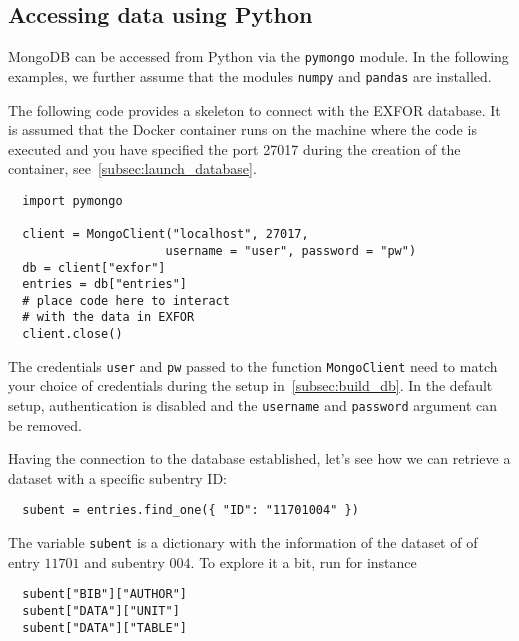 \documentclass[12pt,a4paper]{scrartcl}
\begin{document}
 \subsection{Accessing data using Python}
 MongoDB can be accessed from Python via the \verb|pymongo| module.
 In the following examples, we further assume that the modules \verb|numpy| and \verb|pandas| are installed.

 The following code provides a skeleton to connect with the EXFOR database.
 It is assumed that the Docker container runs on the machine where the code is executed and you have specified the port 27017 during the creation of the container, see~\cref{subsec:launch_database}.

\begin{verbatim}
  import pymongo
 
  client = MongoClient("localhost", 27017,
                      username = "user", password = "pw")                      
  db = client["exfor"]
  entries = db["entries"] 
  # place code here to interact
  # with the data in EXFOR 
  client.close()
\end{verbatim}
The credentials \verb|user| and \verb|pw| passed to the function \verb|MongoClient| need to match your choice of credentials during the setup in~\cref{subsec:build_db}.
In the default setup, authentication is disabled and the \verb|username| and \verb|password| argument can be removed.

Having the connection to the database established, let's see how we can retrieve a dataset with a specific subentry ID:
\begin{verbatim}
  subent = entries.find_one({ "ID": "11701004" })
\end{verbatim}
The variable \verb|subent| is a dictionary with the information of the dataset of of entry $11701$ and subentry $004$.
To explore it a bit, run for instance
\begin{verbatim}
  subent["BIB"]["AUTHOR"]
  subent["DATA"]["UNIT"]
  subent["DATA"]["TABLE"]
\end{verbatim}
\end{document}
